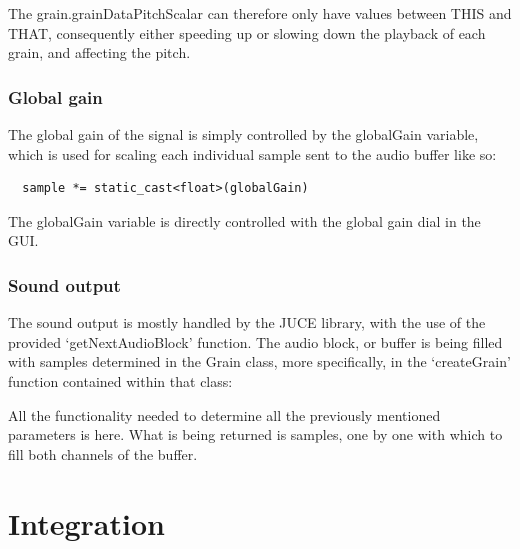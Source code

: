 
The grain.grainDataPitchScalar can therefore only have values between
THIS and THAT, consequently either speeding up or slowing down the
playback of each grain, and affecting the pitch.

\subsubsection{Global gain}
The global gain of the signal is simply controlled by the globalGain
variable, which is used for scaling each individual sample sent to the
audio buffer like so:

\begin{lstlisting}
  sample *= static_cast<float>(globalGain)
\end{lstlisting}

The globalGain variable is directly controlled with the global gain
dial in the GUI.

\subsubsection{Sound output}

The sound output is mostly handled by the JUCE library, with the use
of the provided `getNextAudioBlock' function. The audio block, or
buffer is being filled with samples determined in the Grain class,
more specifically, in the `createGrain' function contained within that
class:


All the functionality needed to determine all the previously mentioned
parameters is  here. What is being returned is samples, one by one
with which to fill both channels of the buffer.


%

\section{Integration}

